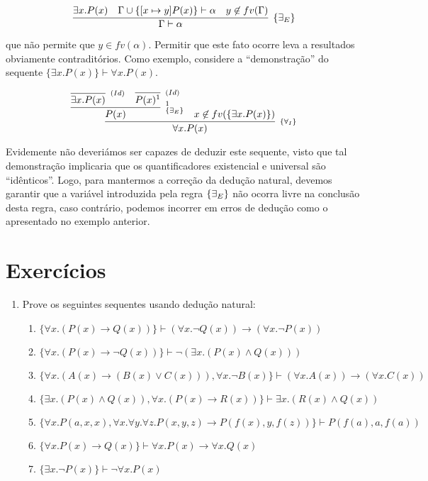 \[
\infer[\existsE]{\Gamma\vdash\alpha}
        {\exists x. P(x) & \Gamma \cup \{[x\mapsto y] P (x)\}\vdash
          \alpha & y \not\in fv(\Gamma)}
\]

que não permite que $y \in fv(\alpha)$. Permitir que este fato ocorre
leva a resultados obviamente contraditórios. Como exemplo, considere a
``demonstração'' do sequente $\{\exists x.P(x)\} \vdash \forall
x. P(x)$.

\[
    \infer[_{\forallI}]{\forall x. P(x)}
                          {
                            \infer[_{\existsE}^1]{P(x)}
                                                   {
                                                     \infer[_{(Id)}]{\exists
                                                     x.P(x)}{} & \infer[_{(Id)}]{P(x)^1}{}
                                                   }
                             & x \not\in fv(\{\exists x. P(x)\})
                          }
\]

Evidemente não deveriámos ser capazes de deduzir este sequente, visto
que tal demonstração implicaria que os quantificadores existencial e
universal são ``idênticos''. Logo, para mantermos a correção da
dedução natural, devemos garantir que a variável introduzida pela
regra $\scriptsize{\{\exists_E}\}$ não ocorra livre na conclusão desta regra, caso
contrário, podemos incorrer em erros de dedução como o apresentado no
exemplo anterior.

\section{Exercícios}

\begin{enumerate}
	\item Prove os seguintes sequentes usando dedu\c{c}\~ao natural:
	\begin{enumerate}
		\item $\{\forall x. (P(x)\rightarrow Q(x))\}\vdash(\forall x.\neg Q(x))\rightarrow(\forall x.\neg P(x))$
		\item $\{\forall x. (P(x)\rightarrow \neg Q(x))\}\vdash\neg (\exists x. (P(x)\land Q(x)))$
		\item $\{\forall x.(A(x)\rightarrow (B(x)\lor C(x))),\forall x.\neg B(x)\}\vdash(\forall x. A(x))\rightarrow
		       (\forall x. C(x))$
		\item $\{\exists x. (P(x)\land Q(x)), \forall x. (P(x)\rightarrow R(x))\}\vdash\exists x.(R(x)\land Q(x))$
		\item $\{\forall x. P(a,x,x), \forall x.\forall
                  y.\forall z. P(x,y,z)\rightarrow
                  P(f(x),y,f(z))\}\vdash P(f(a),a,f(a))$
           \item $\{\forall x. P(x) \rightarrow Q(x)\} \vdash \forall x. P(x) \rightarrow \forall x. Q(x)$
           \item $\{\exists x. \neg P(x) \}\vdash \neg \forall x. P(x)$
	\end{enumerate}
\end{enumerate}

